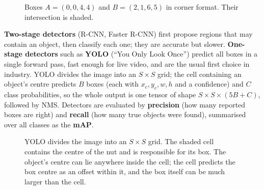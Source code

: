 \documentclass[12pt, a4paper]{article}
\begin{document}
\begin{figure}[H]
  \centering
  \caption{Boxes $A = (0, 0, 4, 4)$ and $B = (2, 1, 6, 5)$ in corner format.
    Their intersection is shaded.}
  \label{fig:iou}
\end{figure}

\textbf{Two-stage detectors} (R-CNN, Faster R-CNN) first propose regions
that may contain an object, then classify each one; they are accurate but
slower. \textbf{One-stage detectors} such as \textbf{YOLO} (``You Only Look
Once'') predict all boxes in a single forward pass, fast enough for live
video, and are the usual first choice in industry. YOLO divides the image into
an $S \times S$ grid; the cell containing an object's centre predicts $B$
boxes (each with $x_c, y_c, w, h$ and a confidence) and $C$ class
probabilities, so the whole output is one tensor of shape
$S \times S \times (5B + C)$, followed by NMS. Detectors are evaluated by
\textbf{precision} (how many reported boxes are right) and \textbf{recall}
(how many true objects were found), summarised over all classes as the
\textbf{mAP}.

\begin{figure}[H]
  \centering
  \caption{YOLO divides the image into an $S \times S$ grid. The shaded cell
    contains the centre of the nut and is responsible for its box. The
    object's centre can lie anywhere inside the cell; the cell predicts the
    box centre as an offset within it, and the box itself can be much larger
    than the cell.}
  \label{fig:yolo}
\end{figure}
\end{document}
